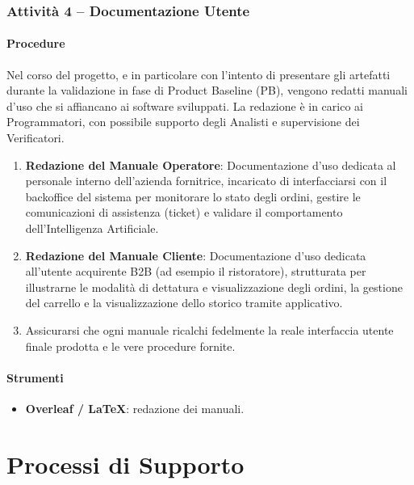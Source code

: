 \documentclass[a4paper, 11pt, oneside]{scrartcl}
\begin{document}
\subsubsection{Attività 4 – Documentazione Utente}

\paragraph{Procedure}
Nel corso del progetto, e in particolare con l'intento di presentare gli artefatti durante la validazione in fase di Product Baseline (PB), vengono redatti manuali d'uso che si affiancano ai software sviluppati. La redazione è in carico ai Programmatori, con possibile supporto degli Analisti e supervisione dei Verificatori.

\begin{enumerate}
    \item \textbf{Redazione del Manuale Operatore}: Documentazione d'uso dedicata al personale interno dell'azienda fornitrice, incaricato di interfacciarsi con il backoffice del sistema per monitorare lo stato degli ordini, gestire le comunicazioni di assistenza (ticket) e validare il comportamento dell'Intelligenza Artificiale.
    \item \textbf{Redazione del Manuale Cliente}: Documentazione d'uso dedicata all'utente acquirente B2B (ad esempio il ristoratore), strutturata per illustrarne le modalità di dettatura e visualizzazione degli ordini, la gestione del carrello e la visualizzazione dello storico tramite applicativo.
    \item Assicurarsi che ogni manuale ricalchi fedelmente la reale interfaccia utente finale prodotta e le vere procedure fornite.
\end{enumerate}

\paragraph{Strumenti}
\begin{itemize}
    \item \textbf{Overleaf / \LaTeX{}}: redazione dei manuali.
\end{itemize}

\newpage
\section{Processi di Supporto}
\end{document}
